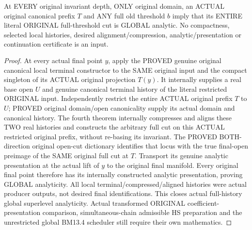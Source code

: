 \begin{theorem}
\label{hir:original-all-depth-arbitrary-full-history-global-analytic}
\leanok
At EVERY original invariant depth, ONLY original domain, an ACTUAL original
canonical prefix $T$ and ANY full old threshold $b$ imply that its ENTIRE
literal ORIGINAL full-threshold cut is GLOBAL analytic. No compactness,
selected local histories, desired alignment/compression, analytic/presentation
or continuation certificate is an input.
\end{theorem}
\begin{proof}
At every actual final point $y$, apply the PROVED genuine original canonical
local terminal constructor to the SAME original input and the compact
singleton of its ACTUAL original projection $T(y)$. It internally supplies
a real base open $U$ and genuine canonical terminal history of the literal
restricted ORIGINAL input. Independently restrict the entire ACTUAL original
prefix $T$ to $U$; PROVED original domain/open canonicality supply its actual
domain and canonical history. The fourth theorem internally compresses and
aligns these TWO real histories and constructs the arbitrary full cut on
this ACTUAL restricted original prefix, without re-basing its invariant.
The PROVED BOTH-direction original open-cut dictionary identifies that locus
with the true final-open preimage of the SAME original full cut at $T$.
Transport its genuine analytic presentation at the actual lift of $y$ to
the original final manifold. Every original final point therefore has its
internally constructed analytic presentation, proving GLOBAL analyticity.
All local terminal/compressed/aligned histories were actual producer outputs,
not desired final identifications. This closes actual full-history global
superlevel analyticity. Actual transformed ORIGINAL coefficient-presentation
comparison, simultaneous-chain admissible HS preparation and the unrestricted
global BM13.4 scheduler still require their own mathematics.
\end{proof}
